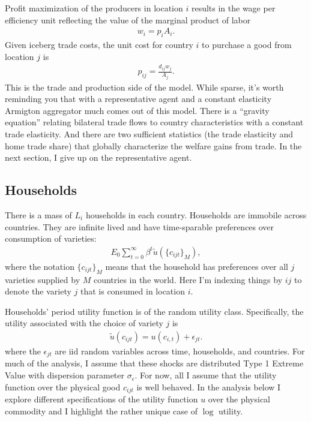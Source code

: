 \documentclass[12pt,pdftex]{article}
\begin{document}
\begin{onehalfspacing}
Profit maximization of the producers in location $i$ results in the wage per efficiency unit reflecting the value of the marginal product of labor
\begin{align}
w_{i} = p_{i} A_{i}.
\label{eq:marginal-product}
\end{align}
Given iceberg trade costs, the unit cost for country $i$ to purchase a good from location $j$ is
\begin{align}
p_{ij} = \frac{d_{ij}w_{j}}{A_{j}}.
\label{eq:marginal-product-ship}
\end{align}
This is the trade and production side of the model. While sparse, it's worth reminding you that with a representative agent and a constant elasticity Armigton aggregator much comes out of this model. There is a ``gravity equation'' relating bilateral trade flows to country characteristics with a constant trade elasticity. And there are two sufficient statistics (the trade elasticity and home trade share) that globally characterize the welfare gains from trade. In the next section, I give up on the representative agent.

\subsection{Households}

There is a mass of $L_i$ households in each country. Households are immobile across countries. They are infinite lived and have time-sparable preferences over consumption of varieties:
\begin{align}
E_{0} \sum_{t = 0}^{\infty} \beta^{t} \tilde{u}( \{ c_{ijt} \}_{M}),
\end{align}
where the notation $\{ c_{ijt} \}_{M}$ means that the household has preferences over all $j$ varieties supplied by $M$ countries in the world. Here I'm indexing things by $ij$ to denote the variety $j$ that is consumed in location $i$.

Households' period utility function is of the random utility class. Specifically, the utility associated with the choice of variety $j$ is
\begin{align}
\tilde{u}( c_{ijt} ) =  u(c_{i,t}) + \epsilon_{jt}. \label{eq:utility}
\end{align}
where the $\epsilon_{jt}$ are iid random variables across time, households, and countries. For much of the analysis, I assume that these shocks are distributed Type 1 Extreme Value with dispersion parameter $\sigma_{\epsilon}$. For now, all I assume that the utility function over the physical good $c_{ijt}$ is well behaved. In the analysis below I explore different specifications of the utility function $u$ over the physical commodity and I highlight the rather unique case of $\log$ utility.


\end{onehalfspacing}
\end{document}
